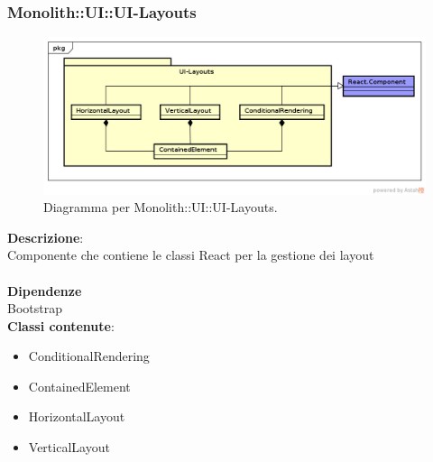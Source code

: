 \clearpage

\subsubsection{Monolith::UI::UI-Layouts}
   \FloatBarrier
   \begin{figure}[ht]
   \centering
\includegraphics[width=\textwidth,keepaspectratio]{img/UI-Layouts}
   \caption{Diagramma per Monolith::UI::UI-Layouts.}
\end{figure}
\FloatBarrier
\textbf{Descrizione}:\\
 Componente che contiene le classi React per la gestione dei layout \\\\
\textbf{Dipendenze} \\
Bootstrap 
\\ \textbf{Classi contenute}:\\
\begin{itemize}
\item ConditionalRendering
\item ContainedElement
\item HorizontalLayout
\item VerticalLayout
\end{itemize}


\clearpage

